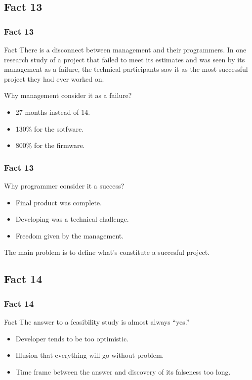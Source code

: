 \documentclass{beamer}
\begin{document}
\subsection{Fact 13}
\begin{frame}
    \frametitle{Fact 13}
    \begin{block}{Fact}
    There is a disconnect between management and their programmers. In one
    research study of a project that failed to meet its estimates and was seen
    by its management as a failure, the technical participants saw it as the
    most successful project they had ever worked on.
    \end{block}
    Why management consider it as a failure?
    \begin{itemize}
    	\item 27 months instead of 14.
    	\item 130\% for the sotfware.
    	\item 800\% for the firmware.
    \end{itemize}
\end{frame}

\begin{frame}
	\frametitle{Fact 13}
	Why programmer consider it a success?
	\begin{itemize}
		\item Final product was complete.
		\item Developing was a technical challenge.
		\item Freedom given by the management.
	\end{itemize}
	The main problem is to define what's constitute a succesful project.
\end{frame}

\subsection{Fact 14}
\begin{frame}
    \frametitle{Fact 14}
    \begin{block}{Fact}
    The answer to a feasibility study is almost always \enquote{yes.}
    \end{block}
    \begin{itemize}
    		\item Developer tends to be too optimistic.
    		\item Illusion that everything will go without problem.
    		\item Time frame between the answer and discovery of its falseness too long.
    \end{itemize}
\end{frame}
\end{document}
